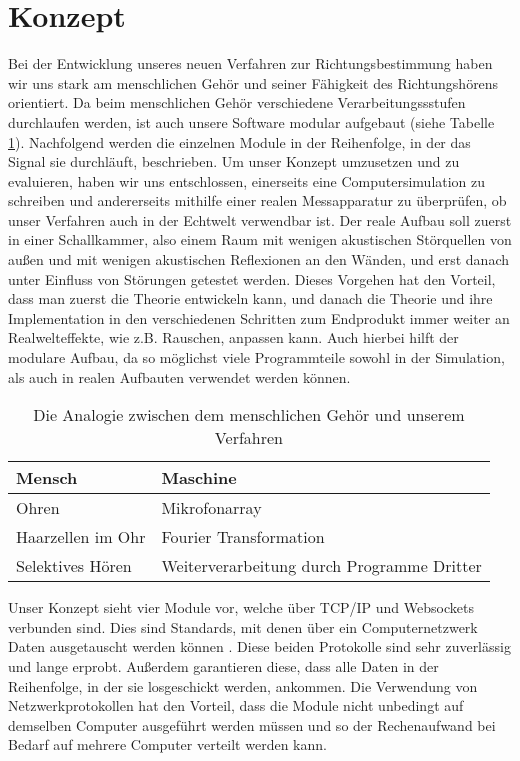 \section{Konzept}
Bei der Entwicklung unseres neuen Verfahren zur Richtungsbestimmung haben wir uns stark am menschlichen Gehör und seiner Fähigkeit des Richtungshörens orientiert. Da beim menschlichen Gehör verschiedene Verarbeitungssstufen durchlaufen werden, ist auch unsere Software modular aufgebaut (siehe Tabelle \ref{analog}). Nachfolgend werden die einzelnen Module in der Reihenfolge, in der das Signal sie durchläuft, beschrieben. 
Um unser Konzept umzusetzen und zu evaluieren, haben wir uns entschlossen, einerseits eine Computersimulation zu schreiben und andererseits mithilfe einer realen Messapparatur zu überprüfen, ob unser Verfahren auch in der Echtwelt verwendbar ist. Der reale Aufbau soll zuerst in einer Schallkammer, also einem Raum mit wenigen akustischen Störquellen von außen und mit wenigen akustischen Reflexionen an den Wänden, und erst danach unter Einfluss von Störungen getestet werden. Dieses Vorgehen hat den Vorteil, dass man zuerst die Theorie entwickeln kann, und danach die Theorie und ihre Implementation in den verschiedenen Schritten zum Endprodukt immer weiter an Realwelteffekte, wie z.B. Rauschen, anpassen kann. Auch hierbei hilft der modulare Aufbau, da so möglichst viele Programmteile sowohl in der Simulation, als auch in realen Aufbauten verwendet werden können.
\begin{table}[h]
	\centering
	\begin{tabular}{l|l}
		Mensch            & Maschine                                   \\ \hline
		Ohren             & Mikrofonarray                              \\
		Haarzellen im Ohr & Fourier Transformation                     \\
		Selektives Hören  & Weiterverarbeitung durch Programme Dritter
	\end{tabular}
	\caption{Die Analogie zwischen dem menschlichen Gehör und unserem Verfahren}
	\label{analog}
\end{table}
Unser Konzept sieht vier Module vor, welche über TCP/IP und Websockets verbunden sind. Dies sind Standards, mit denen über ein Computernetzwerk Daten ausgetauscht werden können \cite{tcp} \cite{websockets}. Diese beiden Protokolle sind sehr zuverlässig und lange erprobt. Außerdem garantieren diese, dass alle Daten in der Reihenfolge, in der sie losgeschickt werden, ankommen. Die Verwendung von Netzwerkprotokollen hat den Vorteil, dass die Module nicht unbedingt auf demselben Computer ausgeführt werden müssen und so der Rechenaufwand bei Bedarf auf mehrere Computer verteilt werden kann.

